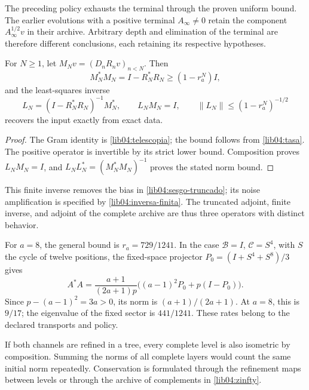 The preceding policy exhausts the terminal through the proven uniform bound.
The earlier evolutions with a positive terminal
\(A_\infty\neq0\) retain the component
\(A_\infty^{1/2}v\) in their archive. Arbitrary depth and elimination of the
terminal are therefore different conclusions, each retaining its
respective hypotheses.

\begin{proposition}
\label{lib04:prop-inversa-finita}
For \(N\geq1\), let \(M_Nv=(D_nR_nv)_{n<N}\). Then
\begin{equation}
 M_N^*M_N=I-R_N^*R_N\geq(1-r_a^N)I,
 \label{lib04:gram-finito}
\end{equation}
and the least-squares inverse
\begin{equation}
 L_N=(I-R_N^*R_N)^{-1}M_N^*,\qquad
 L_NM_N=I,\qquad
 \|L_N\|\leq(1-r_a^N)^{-1/2}
 \label{lib04:inversa-finita}
\end{equation}
recovers the input exactly from exact data.
\end{proposition}

\begin{proof}
The Gram identity is \eqref{lib04:telescopia}; the bound follows from
\eqref{lib04:tasa}. The positive operator is invertible by its strict
lower bound. Composition proves \(L_NM_N=I\), and
\(L_NL_N^*=(M_N^*M_N)^{-1}\) proves the stated norm bound.
\end{proof}

This finite inverse removes the bias in
\eqref{lib04:sesgo-truncado}; its noise amplification is
specified by \eqref{lib04:inversa-finita}. The truncated adjoint,
finite inverse, and adjoint of the complete archive are thus three
operators with distinct behavior.

For \(a=8\), the general bound is \(r_a=729/1241\). In the case
\(\mathcal B=I\), \(\mathcal C=S^4\), with \(S\) the cycle of
twelve positions, the fixed-space projector
\(P_0=(I+S^4+S^8)/3\) gives
\begin{equation}
 A^*A=\frac{a+1}{(2a+1)p}
       \bigl((a-1)^2P_0+p(I-P_0)\bigr).
 \label{lib04:gram-tasa-ternaria}
\end{equation}
Since \(p-(a-1)^2=3a>0\), its norm is
\((a+1)/(2a+1)\). At \(a=8\), this is \(9/17\); the eigenvalue
of the fixed sector is \(441/1241\). These rates belong to the
declared transports and policy.

If both channels are refined in a tree, every complete level is also
isometric by composition. Summing the norms of all complete layers
would count the same initial norm repeatedly. Conservation
is formulated through the refinement maps between levels or
through the archive of complements in \eqref{lib04:zinfty}.

